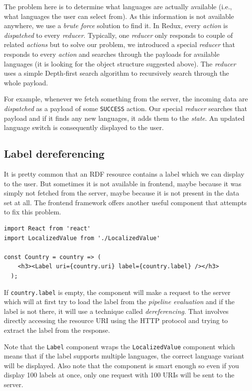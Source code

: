 The problem here is to determine what languages are actually available (i.e., what languages the user can select from). As this information is not available anywhere, we use a \emph{brute force} solution to find it. In Redux, every \emph{action} is \emph{dispatched} to every \emph{reducer}. Typically, one \emph{reducer} only responds to couple of related \emph{actions} but to solve our problem, we introduced a special \emph{reducer} that responds to every \emph{action} and searches through the payloads for available languages (it is looking for the object structure suggested above). The \emph{reducer} uses a simple Depth-first search algorithm to recursively search through the whole payload.

For example, whenever we fetch something from the server, the incoming data are \emph{dispatched} as a payload of some \texttt{SUCCESS} action. Our special \emph{reducer} searches that payload and if it finds any new languages, it adds them to the \emph{state}. An updated language switch is consequently displayed to the user.

\subsection{Label dereferencing}
\label{sec:implementation:advanced-features:label-dereferencering}

It is pretty common that an RDF resource contains a label which we can display to the user. But sometimes it is not available in frontend, maybe because it was simply not fetched from the server, maybe because it is not present in the data set at all. The frontend framework offers another useful component that attempts to fix this problem.

\begin{verbatim}
import React from 'react'
import LocalizedValue from './LocalizedValue'

const Country = country => (
    <h3><Label uri={country.uri} label={country.label} /></h3>
  );
\end{verbatim}

If \texttt{country.label} is empty, the component will make a request to the server which will at first try to load the label from the \emph{pipeline evaluation} and if the label is not there, it will use a technique called \emph{dereferencing}. That involves directly accessing the resource URI using the HTTP protocol and trying to extract the label from the response.

Note that the \texttt{Label} component wraps the \texttt{LocalizedValue} component which means that if the label supports multiple languages, the correct language variant will be displayed. Also note that the component is smart enough so even if you display 100 labels at once, only one request with 100 URIs will be sent to the server.

